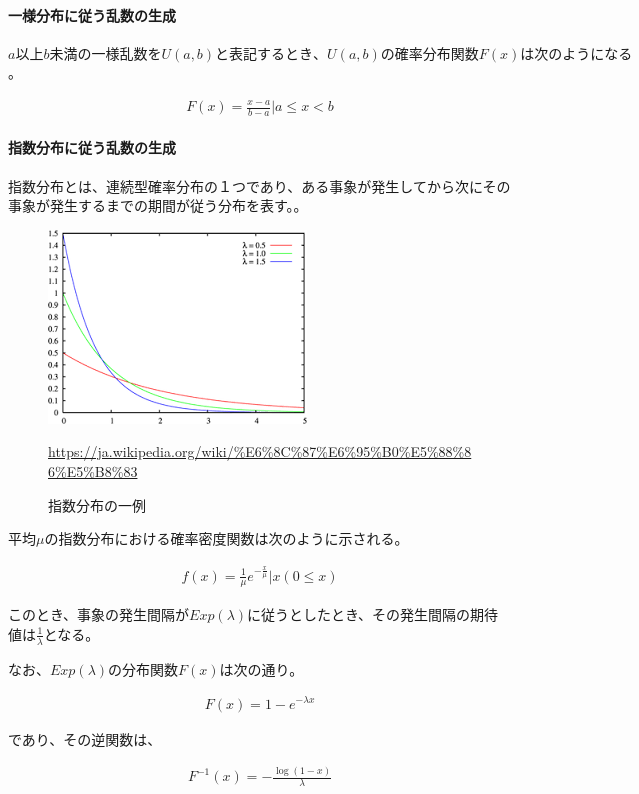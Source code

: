 \documentclass[dvipdfmx]{jsarticle}
\begin{document}
\paragraph{一様分布に従う乱数の生成}
$a以上b未満の一様乱数をU(a,b)と表記するとき、U(a, b)の確率分布関数F(x)は次のようになる$。
\begin{center}
  \begin{align*}
    F(x) = \frac{x-a}{b-a} | a \leq x < b
  \end{align*}
\end{center}
\paragraph{指数分布に従う乱数の生成}
指数分布とは、連続型確率分布の１つであり、ある事象が発生してから次にその事象が発生するまでの期間が従う分布を表す。。
\begin{figure}[H]
  \centering
  \includegraphics[scale=0.6]{sisuu.png}
  \caption{指数分布の一例}
  \url{https://ja.wikipedia.org/wiki/%E6%8C%87%E6%95%B0%E5%88%86%E5%B8%83}
\end{figure}
平均$\mu$の指数分布における確率密度関数は次のように示される。
\begin{center}
  \begin{align*}
    f(x) = \frac{1}{\mu}e^{-\frac{x}{\mu}} | x(0 \leq x)
  \end{align*}
\end{center}
このとき、事象の発生間隔が$Exp(\lambda )$に従うとしたとき、その発生間隔の期待値は$\frac{1}{\lambda}$となる。\par
なお、$Exp(\lambda)$の分布関数$F(x)$は次の通り。
\begin{center}
  \begin{align*}
    F(x) = 1-e^{-\lambda x}
  \end{align*}
\end{center}
であり、その逆関数は、
\begin{center}
  \begin{align*}
    F^{-1}(x) = -\frac{\log(1-x)}{\lambda}
  \end{align*}
\end{center}
\end{document}
